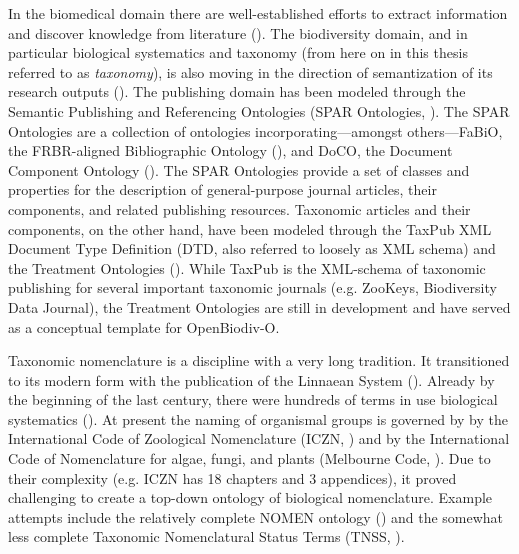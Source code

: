 In the biomedical domain there are well-established efforts to extract information and discover knowledge from literature (\cite{momtchev_expanding_2009, williams_open_2012, rebholz-schuhmann_facts_2005}). The biodiversity domain, and in particular biological systematics and taxonomy (from here on in this thesis referred to as \emph{taxonomy}), is also moving in the direction of semantization of its research outputs (\cite{kennedy_scientific_2005,penev_fast_2010, tzitzikas_integrating_2013}). The publishing domain has been modeled through the Semantic Publishing and Referencing Ontologies (SPAR Ontologies, \cite{peroni_semantic_2014}). The SPAR Ontologies are a collection of ontologies incorporating---amongst others---FaBiO, the FRBR-aligned Bibliographic Ontology (\cite{peroni_fabio_2012}), and DoCO, the Document Component Ontology (\cite{constantin_document_2016}). The SPAR Ontologies provide a set of classes and properties for the description of general-purpose journal articles, their components, and related publishing resources. Taxonomic articles and their components, on the other hand, have been modeled through the TaxPub XML Document Type Definition (DTD, also referred to loosely as XML schema) and the Treatment Ontologies (\cite{catapano_taxpub:_2010,catapano_treatment_2016}). While TaxPub is the XML-schema of taxonomic publishing for several important taxonomic journals (e.g. ZooKeys, Biodiversity Data Journal), the Treatment Ontologies are still in development and have served as a conceptual template for \mbox{OpenBiodiv-O}.

Taxonomic nomenclature is a discipline with a very long tradition. It transitioned to its modern form with the publication of the Linnaean System (\cite{linnaeus_systema_1758}). Already by the beginning of the last century, there were hundreds of terms in use biological systematics (\cite{witteveen_naming_2015}). At present the naming of organismal groups is governed by by the International Code of Zoological Nomenclature (ICZN, \cite{international_commission_on_zoological_nomenclature_international_1999}) and by the International Code of Nomenclature for algae, fungi, and plants (Melbourne Code, \cite{noauthor_international_2012}). Due to their complexity (e.g. ICZN has 18 chapters and 3 appendices), it proved challenging to create a top-down ontology of biological nomenclature. Example attempts include the relatively complete NOMEN ontology (\cite{dmitriev_nomen_2017}) and the somewhat less complete Taxonomic Nomenclatural Status Terms (TNSS, \cite{morris_taxonomic_nodate}).

